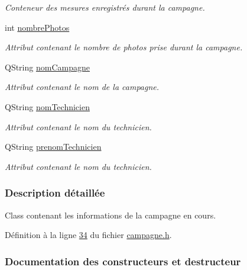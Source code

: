 \begin{DoxyCompactItemize}
\begin{DoxyCompactList}\small\item\em Conteneur des mesures enregistrés durant la campagne. \end{DoxyCompactList}\item 
int \hyperlink{class_campagne_a3696e02e3cefc30bf4f284152917718b}{nombre\+Photos}
\begin{DoxyCompactList}\small\item\em Attribut contenant le nombre de photos prise durant la campagne. \end{DoxyCompactList}\item 
Q\+String \hyperlink{class_campagne_a4455078418041442fa3998b9b6cb6230}{nom\+Campagne}
\begin{DoxyCompactList}\small\item\em Attribut contenant le nom de la campagne. \end{DoxyCompactList}\item 
Q\+String \hyperlink{class_campagne_a6d3e88fb93b38cbcf1bc53cc9fc30f2f}{nom\+Technicien}
\begin{DoxyCompactList}\small\item\em Attribut contenant le nom du technicien. \end{DoxyCompactList}\item 
Q\+String \hyperlink{class_campagne_a9cc37c9671136683b5dac87ff34017bc}{prenom\+Technicien}
\begin{DoxyCompactList}\small\item\em Attribut contenant le nom du technicien. \end{DoxyCompactList}\end{DoxyCompactItemize}


\subsubsection{Description détaillée}
Class contenant les informations de la campagne en cours. 

Définition à la ligne \hyperlink{campagne_8h_source_l00034}{34} du fichier \hyperlink{campagne_8h_source}{campagne.\+h}.



\subsubsection{Documentation des constructeurs et destructeur}
\mbox{\label{class_campagne_aba78ce7d7b921053abc69e22789ec6da}} 
